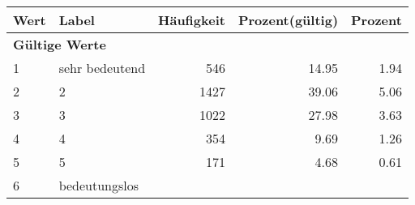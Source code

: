      \begin{longtable}{lXrrr}
     \toprule
     \textbf{Wert} & \textbf{Label} & \textbf{Häufigkeit} & \textbf{Prozent(gültig)} & \textbf{Prozent} \\
     \endhead
     \midrule
     \multicolumn{5}{l}{\textbf{Gültige Werte}}\\

     1 &
     \multicolumn{1}{X}{ sehr bedeutend   } &


       \num{546} &
       \num[round-mode=places,round-precision=2]{14,95} &
         \num[round-mode=places,round-precision=2]{1,94} \\

     2 &
     \multicolumn{1}{X}{ 2   } &


       \num{1427} &
       \num[round-mode=places,round-precision=2]{39,06} &
         \num[round-mode=places,round-precision=2]{5,06} \\

     3 &
     \multicolumn{1}{X}{ 3   } &


       \num{1022} &
       \num[round-mode=places,round-precision=2]{27,98} &
         \num[round-mode=places,round-precision=2]{3,63} \\

     4 &
     \multicolumn{1}{X}{ 4   } &


       \num{354} &
       \num[round-mode=places,round-precision=2]{9,69} &
         \num[round-mode=places,round-precision=2]{1,26} \\

     5 &
     \multicolumn{1}{X}{ 5   } &


       \num{171} &
       \num[round-mode=places,round-precision=2]{4,68} &
         \num[round-mode=places,round-precision=2]{0,61} \\

     6 &
     \multicolumn{1}{X}{ bedeutungslos   } &



\end{longtable}
